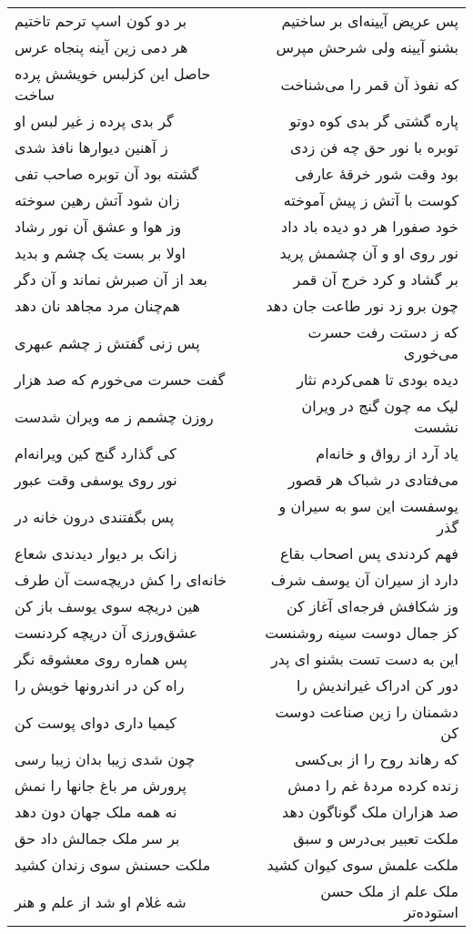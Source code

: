 \begin{center}
\begin{longtable}{l p{0.5cm} r}
بر دو کون اسپ ترحم تاختیم
&&
پس عریض آیینه‌ای بر ساختیم
\\
هر دمی زین آینه پنجاه عرس
&&
بشنو آیینه ولی شرحش مپرس
\\
حاصل این کزلبس خویشش پرده ساخت
&&
که نفوذ آن قمر را می‌شناخت
\\
گر بدی پرده ز غیر لبس او
&&
پاره گشتی گر بدی کوه دوتو
\\
ز آهنین دیوارها نافذ شدی
&&
توبره با نور حق چه فن زدی
\\
گشته بود آن توبره صاحب تفی
&&
بود وقت شور خرقهٔ عارفی
\\
زان شود آتش رهین سوخته
&&
کوست با آتش ز پیش آموخته
\\
وز هوا و عشق آن نور رشاد
&&
خود صفورا هر دو دیده باد داد
\\
اولا بر بست یک چشم و بدید
&&
نور روی او و آن چشمش پرید
\\
بعد از آن صبرش نماند و آن دگر
&&
بر گشاد و کرد خرج آن قمر
\\
هم‌چنان مرد مجاهد نان دهد
&&
چون برو زد نور طاعت جان دهد
\\
پس زنی گفتش ز چشم عبهری
&&
که ز دستت رفت حسرت می‌خوری
\\
گفت حسرت می‌خورم که صد هزار
&&
دیده بودی تا همی‌کردم نثار
\\
روزن چشمم ز مه ویران شدست
&&
لیک مه چون گنج در ویران نشست
\\
کی گذارد گنج کین ویرانه‌ام
&&
یاد آرد از رواق و خانه‌ام
\\
نور روی یوسفی وقت عبور
&&
می‌فتادی در شباک هر قصور
\\
پس بگفتندی درون خانه در
&&
یوسفست این سو به سیران و گذر
\\
زانک بر دیوار دیدندی شعاع
&&
فهم کردندی پس اصحاب بقاع
\\
خانه‌ای را کش دریچه‌ست آن طرف
&&
دارد از سیران آن یوسف شرف
\\
هین دریچه سوی یوسف باز کن
&&
وز شکافش فرجه‌ای آغاز کن
\\
عشق‌ورزی آن دریچه کردنست
&&
کز جمال دوست سینه روشنست
\\
پس هماره روی معشوقه نگر
&&
این به دست تست بشنو ای پدر
\\
راه کن در اندرونها خویش را
&&
دور کن ادراک غیراندیش را
\\
کیمیا داری دوای پوست کن
&&
دشمنان را زین صناعت دوست کن
\\
چون شدی زیبا بدان زیبا رسی
&&
که رهاند روح را از بی‌کسی
\\
پرورش مر باغ جانها را نمش
&&
زنده کرده مردهٔ غم را دمش
\\
نه همه ملک جهان دون دهد
&&
صد هزاران ملک گوناگون دهد
\\
بر سر ملک جمالش داد حق
&&
ملکت تعبیر بی‌درس و سبق
\\
ملکت حسنش سوی زندان کشید
&&
ملکت علمش سوی کیوان کشید
\\
شه غلام او شد از علم و هنر
&&
ملک علم از ملک حسن استوده‌تر
\\
\end{longtable}
\end{center}
